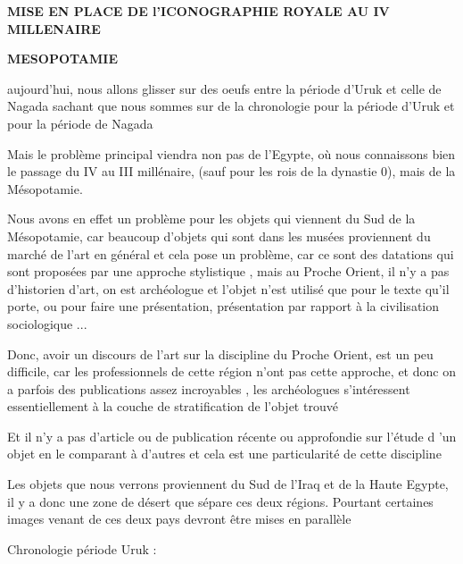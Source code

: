 \documentclass[a4paper]{article}
\begin{document}
\bigskip

{
\textbf{MISE EN PLACE DE l'ICONOGRAPHIE ROYALE AU IV MILLENAIRE}}


\bigskip


\bigskip

{
\textbf{MESOPOTAMIE}}


\bigskip

{
aujourd'hui, nous allons glisser sur des oeufs entre la période d'Uruk et celle de Nagada sachant que nous sommes sur de
la chronologie pour la période d'Uruk et pour la période de Nagada}

{
Mais le problème principal viendra non pas de l'Egypte, où nous connaissons bien le passage du IV au III millénaire,
(sauf pour les rois de la dynastie 0), mais de la Mésopotamie.}

{
Nous avons en effet un problème pour les objets qui viennent du Sud de la Mésopotamie, car beaucoup d'objets qui sont
dans les musées proviennent du marché de l'art en général et cela pose un problème, car ce sont des datations qui sont
proposées par une approche stylistique , mais au Proche Orient, il n'y a pas d'historien d'art, on est archéologue et
l'objet n'est utilisé que pour le texte qu'il porte, ou pour faire une présentation, présentation par rapport à la
civilisation sociologique ...}


\bigskip


\bigskip

{
Donc, avoir un discours de l'art sur la discipline du Proche Orient, est un peu difficile, car les professionnels de
cette région n'ont pas cette approche, et donc on a parfois des publications assez incroyables , les archéologues
s'intéressent essentiellement à la couche de stratification de l'objet trouvé}

{
Et il n'y a pas d'article ou de publication récente ou approfondie sur l'étude d 'un objet en le comparant à d'autres et
cela est une particularité de cette discipline}


\bigskip

{
Les objets que nous verrons proviennent du Sud de l'Iraq et de la Haute Egypte, il y a donc une zone de désert que
sépare ces deux régions. Pourtant certaines images venant de ces deux pays devront être mises en parallèle}


\bigskip

{
Chronologie période Uruk : }
\end{document}

